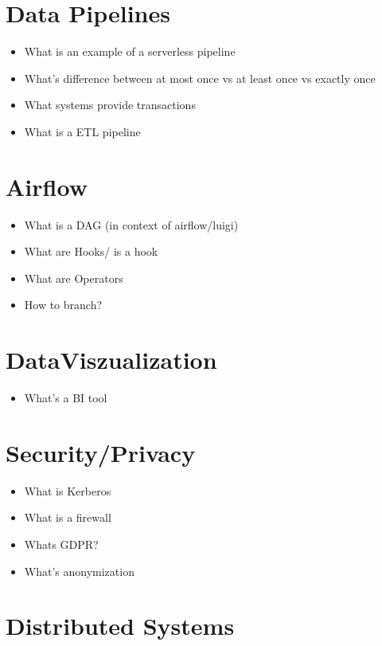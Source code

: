 \documentclass[12pt, numbers=noenddot]{scrreprt} %
\begin{document}
\section*{Data Pipelines}

\begin{itemize}
\item  What is an example of a serverless pipeline
\item  What's difference between at most once vs at least once vs exactly once
\item  What systems provide transactions
\item  What is a ETL pipeline
\end{itemize}

\section*{Airflow}

\begin{itemize}
\item What is a DAG (in context of airflow/luigi)
\item What are Hooks/ is a hook
\item What are Operators
\item How to branch?
\end{itemize}

\section*{DataViszualization}

\begin{itemize}
\item What's a BI tool
\end{itemize}

\section*{Security/Privacy}

\begin{itemize}
\item What is Kerberos
\item What is a firewall
\item Whats GDPR?
\item What's anonymization
\end{itemize}

\section*{Distributed Systems}
\end{document}

